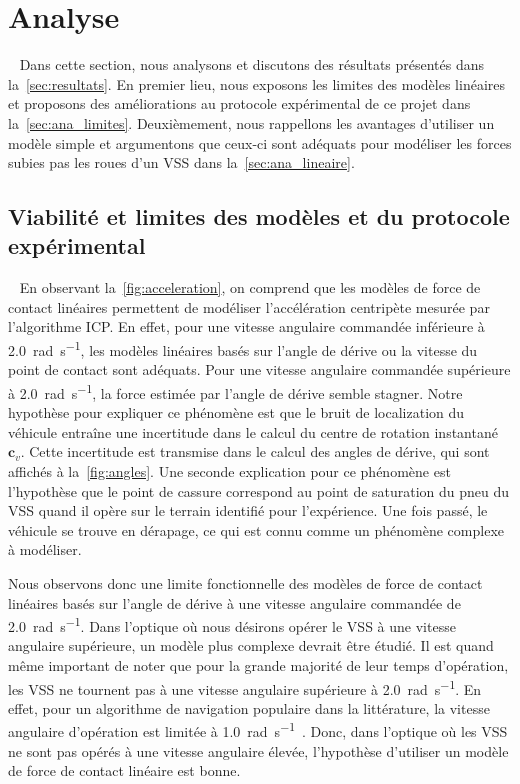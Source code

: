 \section{Analyse}~\label{sec:analyse}
Dans cette section, nous analysons et discutons des résultats présentés dans la~\autoref{sec:resultats}.
En premier lieu, nous exposons les limites des modèles linéaires et proposons des améliorations au protocole expérimental de ce projet dans la~\autoref{sec:ana_limites}.
Deuxièmement, nous rappellons les avantages d'utiliser un modèle simple et argumentons que ceux-ci sont adéquats pour modéliser les forces subies pas les roues d'un \ac{VSS} dans la~\autoref{sec:ana_lineaire}.

\subsection{Viabilité et limites des modèles et du protocole expérimental}~\label{sec:ana_limites}
En observant la~\autoref{fig:acceleration}, on comprend que les modèles de force de contact linéaires permettent de modéliser l'accélération centripète mesurée par l'algorithme \ac{ICP}.
En effet, pour une vitesse angulaire commandée inférieure à \SI{2.0}{\radian\per\second}, les modèles linéaires basés sur l'angle de dérive ou la vitesse du point de contact sont adéquats.
Pour une vitesse angulaire commandée supérieure à \SI{2.0}{\radian\per\second}, la force estimée par l'angle de dérive semble stagner. 
Notre hypothèse pour expliquer ce phénomène est que le bruit de localization du véhicule entraîne une incertitude dans le calcul du centre de rotation instantané $\bm c_v$.
Cette incertitude est transmise dans le calcul des angles de dérive, qui sont affichés à la~\autoref{fig:angles}.
Une seconde explication pour ce phénomène est l'hypothèse que le point de cassure correspond au point de saturation du pneu du \ac{VSS} quand il opère sur le terrain identifié pour l'expérience.
Une fois passé, le véhicule se trouve en dérapage, ce qui est connu comme un phénomène complexe à modéliser.

Nous observons donc une limite fonctionnelle des modèles de force de contact linéaires basés sur l'angle de dérive à une vitesse angulaire commandée de \SI{2.0}{\radian\per\second}.
Dans l'optique où nous désirons opérer le \ac{VSS} à une vitesse angulaire supérieure, un modèle plus complexe devrait être étudié.
Il est quand même important de noter que pour la grande majorité de leur temps d'opération, les \ac{VSS} ne tournent pas à une vitesse angulaire supérieure à \SI{2.0}{\radian\per\second}.
En effet, pour un algorithme de navigation populaire dans la littérature, la vitesse angulaire d'opération est limitée à \SI{1.0}{\radian\per\second}~\citep{Huskic2019}.
Donc, dans l'optique où les \ac{VSS} ne sont pas opérés à une vitesse angulaire élevée, l'hypothèse d'utiliser un modèle de force de contact linéaire est bonne.


